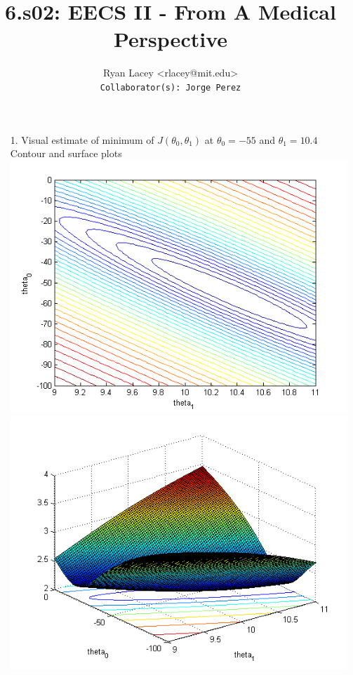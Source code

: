 \documentclass{article}
\begin{document}

\title{6.s02: EECS II - From A Medical Perspective}
\author{
  Ryan Lacey <rlacey@mit.edu>\\
  \footnotesize \texttt{Collaborator(s): Jorge Perez}
}
        
\maketitle
        


\begin{enumerate}
\item[1.]
	Visual estimate of minimum of $J\left(\theta_0, \theta_1\right)$ at $\theta_0 = -55$ and $\theta_1 = 10.4$\\
	
	Contour and surface plots\\
	
	\includegraphics[width=\linewidth/2]{../images/LossContour} \includegraphics[width=\linewidth/2]{../images/LossSurface}\\
 

\end{enumerate}
\end{document}
